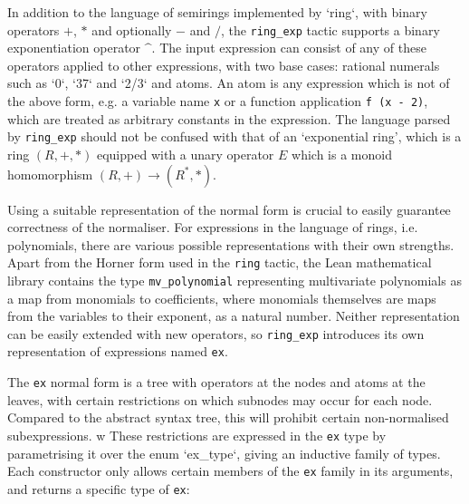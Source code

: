 \documentclass{llncs}
\newcommand{\lean}[1]{\texttt{#1}\xspace} %
\newcommand{\ex}{\lean{ex}}
\newcommand{\ring}{\lean{ring}}
\newcommand{\ringexp}{\lean{ring\_exp}}
\begin{document}
In addition to the language of semirings implemented by `ring`, with binary operators $+$, $*$ and optionally $-$ and $/$,
the \ringexp tactic supports a binary exponentiation operator $\^$.
The input expression can consist of any of these operators applied to other expressions,
with two base cases: rational numerals such as `0`, `37` and `2/3` and atoms.
An atom is any expression which is not of the above form, e.g. a variable name \lean{x} or a function application \lean{f (x - 2)},
which are treated as arbitrary constants in the expression.
The language parsed by \ringexp should not be confused with that of an `exponential ring', which is a ring $(R, +, *)$ equipped with a unary operator $E$ which is a monoid homomorphism $(R, +) \to (R^*, *)$.


Using a suitable representation of the normal form is crucial to easily guarantee correctness of the normaliser.
For expressions in the language of rings, i.e. polynomials,
there are various possible representations with their own strengths.
Apart from the Horner form used in the \ring tactic,
the Lean mathematical library contains the type \lean{mv\_polynomial} representing multivariate polynomials
as a map from monomials to coefficients, where monomials themselves are maps from the variables to their exponent, as a natural number.
Neither representation can be easily extended with new operators,
so \ringexp introduces its own representation of expressions named \ex. 

The \ex normal form is a tree with operators at the nodes and atoms at the leaves,
with certain restrictions on which subnodes may occur for each node.
Compared to the abstract syntax tree, this will prohibit certain non-normalised subexpressions.
w%
These restrictions are expressed in the \ex type by parametrising it over the enum `ex\_type`,
giving an inductive family of types.
Each constructor only allows certain members of the \ex family in its arguments,
and returns a specific type of \ex:
\end{document}
